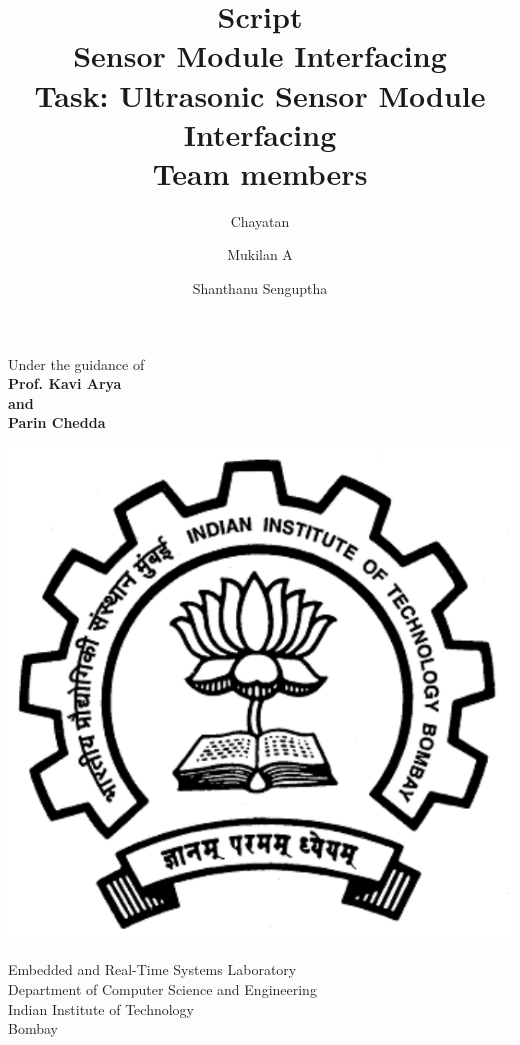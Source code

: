 \documentclass[a4paper,29.6pt]{article}
\title {Script\\Sensor Module Interfacing \\[10pt] Task: Ultrasonic Sensor Module Interfacing \\[25pt] Team members }
\author {Chayatan \and Mukilan A \and Shanthanu Senguptha}
\begin{document}
\maketitle
\begin{center}
\begin{large}
Under the guidance of\\
\textbf{Prof. Kavi Arya\\and\\Parin Chedda}\\
\vspace{0.5in}
\end{large}
\end{center}
\begin{center}
\includegraphics[scale=0.32]{iitblogo.pdf}
\end{center}
\begin{center}
\begin{large}
Embedded and Real-Time Systems Laboratory \\
Department of Computer Science and Engineering \\
Indian Institute of Technology \\
Bombay \\
\end{large}
\end{center}
\end{document}
